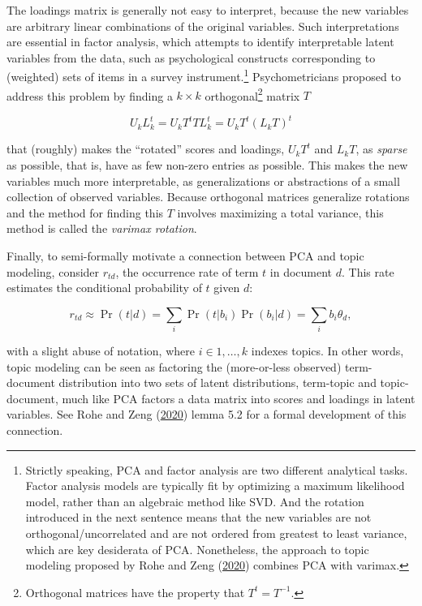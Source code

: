 \documentclass[
]{article}
\begin{document}
The loadings matrix is generally not easy to interpret, because the new
variables are arbitrary linear combinations of the original variables.
Such interpretations are essential in factor analysis, which attempts to
identify interpretable latent variables from the data, such as
psychological constructs corresponding to (weighted) sets of items in a
survey instrument.\footnote{Strictly speaking, PCA and factor analysis
  are two different analytical tasks. Factor analysis models are
  typically fit by optimizing a maximum likelihood model, rather than an
  algebraic method like SVD. And the rotation introduced in the next
  sentence means that the new variables are not orthogonal/uncorrelated
  and are not ordered from greatest to least variance, which are key
  desiderata of PCA. Nonetheless, the approach to topic modeling
  proposed by Rohe and Zeng
  (\protect\hyperlink{ref-RoheVintageFactorAnalysis2020}{2020}) combines
  PCA with varimax.} Psychometricians proposed to address this problem
by finding a \(k \times k\) orthogonal\footnote{Orthogonal matrices have
  the property that \(T^t = T^{-1}\).} matrix \(T\)

\[ U_k L_k^t = U_k T^t T L_k^t = U_k T^t (L_k T)^t \]

that (roughly) makes the ``rotated'' scores and loadings, \(U_k T^t\)
and \(L_k T\), as \emph{sparse} as possible, that is, have as few
non-zero entries as possible. This makes the new variables much more
interpretable, as generalizations or abstractions of a small collection
of observed variables. Because orthogonal matrices generalize rotations
and the method for finding this \(T\) involves maximizing a total
variance, this method is called the \emph{varimax rotation}.

Finally, to semi-formally motivate a connection between PCA and topic
modeling, consider \(r_{td}\), the occurrence rate of term \(t\) in
document \(d\). This rate estimates the conditional probability of \(t\)
given \(d\):

\[ r_{td} \approx \Pr(t | d) = \sum_i \Pr(t | b_i) \Pr(b_i | d) = \sum_i b_i \theta_d, \]

with a slight abuse of notation, where \(i \in 1, \ldots, k\) indexes
topics. In other words, topic modeling can be seen as factoring the
(more-or-less observed) term-document distribution into two sets of
latent distributions, term-topic and topic-document, much like PCA
factors a data matrix into scores and loadings in latent variables. See
Rohe and Zeng
(\protect\hyperlink{ref-RoheVintageFactorAnalysis2020}{2020}) lemma 5.2
for a formal development of this connection.
\end{document}
